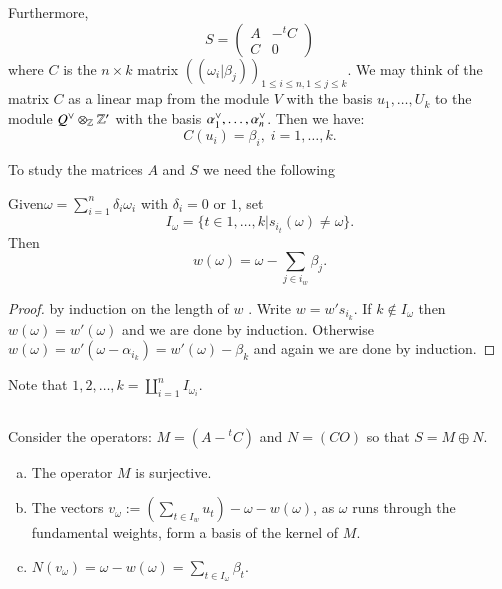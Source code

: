 Furthermore,
$$
S =
\begin{pmatrix}
A  & -^{t}C\\
C & 0
\end{pmatrix}
$$
where $C$ is the $n\times k$ matrix $((\omega_{i} | \beta_{j}))_{1 \leq i \leq n, 1 \leq j \leq k}$. We may think of the matrix $C$ as a linear map from the module $V$ with the basis $u_{1}, \ldots, U_{k}$ to the module $Q\spcheck \otimes _{\bbZ}\bbZ'$ with the basis $\alpha_{1}\spcheck, \ldots, \alpha_{n}\spcheck$. Then we have:
\begin{equation*}
C(u_{i}) = \beta_{i}, \; i =1,\ldots, k.\tag{3.2.1}\label{chap4-eq3.2.1}
\end{equation*}

To study the matrices $A$ and $S$ we need the following

\begin{lemma*}
Given\pageoriginale $\omega = \sum_{i=1}^{n}\delta_{i}\omega_{i}$ with $\delta_{i} = 0$ or $1$, set
$$
I_{\omega} = \{t \in {1,\ldots, k} | s_{i_{t}}(\omega) \neq \omega\}.
$$
Then
$$
w(\omega) = \omega - \sum\limits_{j\in i_{w}} \beta_{j}.
$$
\end{lemma*}

\begin{proof}
by induction on the length of $w$ . Write $w=w' s_{i_{k}}$. If $k \not\in I_{\omega}$ then $w(\omega)= w'(\omega)$ and we are done by induction. Otherwise $w(\omega) = w'(\omega-\alpha_{i_{k}}) = w'(\omega)-\beta_{k}$ and again we are done by induction.
\end{proof}

Note that ${1,2,\ldots, k} = \coprod\limits_{i=1}^{n}I_{\omega_{i}}$. 

\subsection{}\label{chap4-subsec-3.3}
Consider the operators: $M=(A -{}^{t}C)$ and $N=(C O)$ so that $S= M\oplus N$.

\newpage

\begin{lemma*}
\begin{enumerate}[(a)]
\item The operator $M$ is surjective.\label{chap4-enum_l_(a)}
\item The vectors $v_{\omega}:=\left(\sum_{t \in I_{w}} u_{t}\right)-\omega-w(\omega)$, as $\omega$ runs through the fundamental weights, form a basis of the kernel of $M$.\label{chap4-enum_l_(b)}
\item $N(v_{\omega}) = \omega - w(\omega) = \sum_{t\in I_{\omega}}\beta_{t}$.\label{chap4-enum_l_(c)}
\end{enumerate}
\end{lemma*}

